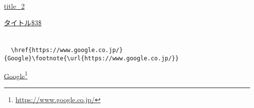 \documentclass[uplatex, oneside]{jsbook}
\begin{document}
\href{http://localhost:3000/sample/page2}{title\_2}

\href{http://localhost:3000/sample/page3}{タイトル\$3\$}

\chapter{}

\newpage

\begin{verbatim}
  \href{https://www.google.co.jp/}{Google}\footnote{\url{https://www.google.co.jp/}}
\end{verbatim}

\href{https://www.google.co.jp/}{Google}\footnote{\url{https://www.google.co.jp/}}
\end{document}
